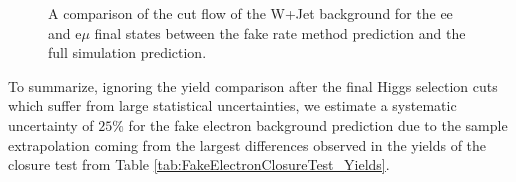 \begin{figure}[!htbp]
\begin{center}
\caption{A comparison of the cut flow of the W+Jet background for the ee and e$\mu$ final states
between the fake rate method prediction and the full simulation prediction. }
\label{fig:FakeElectronClosureTest_CutFlow}
\end{center}
\end{figure}

To summarize, ignoring the yield comparison after the final Higgs selection cuts which 
suffer from large statistical uncertainties, we estimate a systematic uncertainty of 
$25\%$ for the fake electron background prediction due to the sample extrapolation 
coming from the largest differences observed in the yields of the closure test from 
Table \ref{tab:FakeElectronClosureTest_Yields}. 


